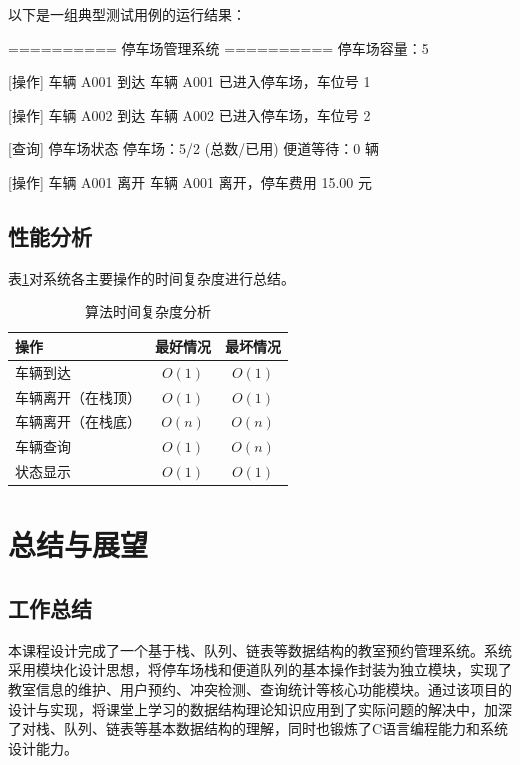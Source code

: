\documentclass[a4paper,12pt,twoside]{ctexrep}
\begin{document}
以下是一组典型测试用例的运行结果：

\begin{codeblock}
========== 停车场管理系统 ==========
停车场容量：5

[操作] 车辆 A001 到达
车辆 A001 已进入停车场，车位号 1

[操作] 车辆 A002 到达
车辆 A002 已进入停车场，车位号 2

[查询] 停车场状态
停车场：5/2 (总数/已用)
便道等待：0 辆

[操作] 车辆 A001 离开
车辆 A001 离开，停车费用 15.00 元
\end{codeblock}

\section{性能分析}

表\ref{tab:complex}对系统各主要操作的时间复杂度进行总结。

\begin{table}[htbp]
  \centering
  \caption{算法时间复杂度分析}
  \label{tab:complex}
  \begin{tabular}{lcc}
    \toprule
    \textbf{操作} & \textbf{最好情况} & \textbf{最坏情况} \\
    \midrule
    车辆到达 & $O(1)$ & $O(1)$ \\
    车辆离开（在栈顶） & $O(1)$ & $O(1)$ \\
    车辆离开（在栈底） & $O(n)$ & $O(n)$ \\
    车辆查询 & $O(1)$ & $O(n)$ \\
    状态显示 & $O(1)$ & $O(1)$ \\
    \bottomrule
  \end{tabular}
\end{table}

\cleardoublepage
\chapter{总结与展望}

\section{工作总结}

本课程设计完成了一个基于栈、队列、链表等数据结构的教室预约管理系统。系统采用模块化设计思想，将停车场栈和便道队列的基本操作封装为独立模块，实现了教室信息的维护、用户预约、冲突检测、查询统计等核心功能模块。通过该项目的设计与实现，将课堂上学习的数据结构理论知识应用到了实际问题的解决中，加深了对栈、队列、链表等基本数据结构的理解，同时也锻炼了C语言编程能力和系统设计能力。
\end{document}
